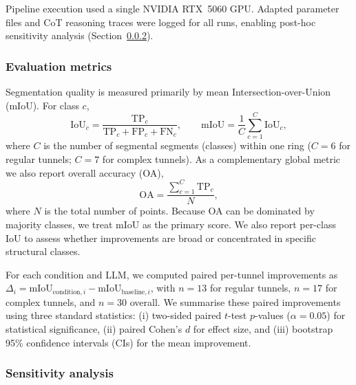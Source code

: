 \documentclass[a4paper,fleqn]{cas-dc}
\begin{document}
{Pipeline execution used a single NVIDIA RTX~5060 GPU. Adapted parameter files and CoT reasoning traces were logged for all runs, enabling post-hoc sensitivity analysis (Section~\ref{sec:sensitivity-method}).

\subsubsection{Evaluation metrics}\label{sec:metrics}

Segmentation quality is measured primarily by mean Intersection-over-Union (mIoU). For class $c$,
\begin{equation}
\text{IoU}_c = \frac{\text{TP}_c}{\text{TP}_c + \text{FP}_c + \text{FN}_c}, \qquad
\text{mIoU} = \frac{1}{C} \sum_{c=1}^{C} \text{IoU}_c,
\end{equation}
where $C$ is the number of segmental segments (classes) within one ring ($C=6$ for regular tunnels; $C=7$ for complex tunnels). As a complementary global metric we also report overall accuracy (OA),
\begin{equation}
\text{OA} = \frac{\sum_{c=1}^{C} \text{TP}_c}{N},
\end{equation}
where $N$ is the total number of points. Because OA can be dominated by majority classes, we treat mIoU as the primary score. We also report per-class IoU to assess whether improvements are broad or concentrated in specific structural classes.

For each condition and LLM, we computed paired per-tunnel improvements as $\Delta_i = \mathrm{mIoU}_{\text{condition},i} - \mathrm{mIoU}_{\text{baseline},i}$, with $n=13$ for regular tunnels, $n=17$ for complex tunnels, and $n=30$ overall. We summarise these paired improvements using three standard statistics: (i) two-sided paired $t$-test $p$-values ($\alpha = 0.05$) for statistical significance, (ii) paired Cohen's \mbox{$d$} for effect size, and (iii) bootstrap 95\% confidence intervals (CIs) for the mean improvement.

\subsubsection{Sensitivity analysis}\label{sec:sensitivity-method}

}
\end{document}
